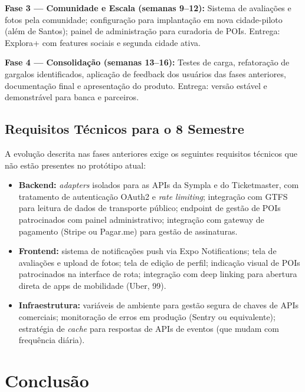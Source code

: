 \documentclass[12pt, a4paper]{article}
\begin{document}
\textbf{Fase 3 --- Comunidade e Escala (semanas 9--12):} Sistema de avalia\c{c}\~oes e fotos pela comunidade; configura\c{c}\~ao para implanta\c{c}\~ao em nova cidade-piloto (al\'em de Santos); painel de administra\c{c}\~ao para curadoria de POIs. Entrega: Explora+ com features sociais e segunda cidade ativa.

\textbf{Fase 4 --- Consolida\c{c}\~ao (semanas 13--16):} Testes de carga, refatora\c{c}\~ao de gargalos identificados, aplica\c{c}\~ao de feedback dos usu\'arios das fases anteriores, documenta\c{c}\~ao final e apresenta\c{c}\~ao do produto. Entrega: vers\~ao est\'avel e demonstr\'avel para banca e parceiros.

\subsection{Requisitos T\'ecnicos para o 8\textordmasculine{} Semestre}

A evolu\c{c}\~ao descrita nas fases anteriores exige os seguintes requisitos t\'ecnicos que n\~ao est\~ao presentes no prot\'otipo atual:

\begin{itemize}
  \item \textbf{Backend:} \textit{adapters} isolados para as APIs da Sympla e do Ticketmaster, com tratamento de autentica\c{c}\~ao OAuth2 e \textit{rate limiting}; integra\c{c}\~ao com GTFS para leitura de dados de transporte p\'ublico; endpoint de gest\~ao de POIs patrocinados com painel administrativo; integra\c{c}\~ao com gateway de pagamento (Stripe ou Pagar.me) para gest\~ao de assinaturas.

  \item \textbf{Frontend:} sistema de notifica\c{c}\~oes push via Expo Notifications; tela de avalia\c{c}\~oes e upload de fotos; tela de edi\c{c}\~ao de perfil; indica\c{c}\~ao visual de POIs patrocinados na interface de rota; integra\c{c}\~ao com deep linking para abertura direta de apps de mobilidade (Uber, 99).

  \item \textbf{Infraestrutura:} vari\'aveis de ambiente para gest\~ao segura de chaves de APIs comerciais; monitora\c{c}\~ao de erros em produ\c{c}\~ao (Sentry ou equivalente); estrat\'egia de \textit{cache} para respostas de APIs de eventos (que mudam com frequ\^encia di\'aria).
\end{itemize}

\section{Conclus\~ao}
\end{document}
